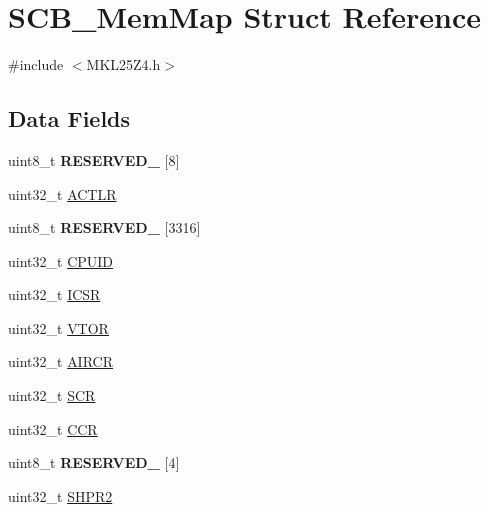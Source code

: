 \hypertarget{struct_s_c_b___mem_map}{}\section{S\+C\+B\+\_\+\+Mem\+Map Struct Reference}
\label{struct_s_c_b___mem_map}


{\ttfamily \#include $<$M\+K\+L25\+Z4.\+h$>$}

\subsection*{Data Fields}
\begin{DoxyCompactItemize}
\item 
\mbox{\label{struct_s_c_b___mem_map_ad1b50f88903f5b63f2b92b7195511d00}} 
uint8\+\_\+t {\bfseries R\+E\+S\+E\+R\+V\+E\+D\+\_} \mbox{[}8\mbox{]}
\item 
uint32\+\_\+t \hyperlink{struct_s_c_b___mem_map_a474a33074611146734690e48ed41282e}{A\+C\+T\+LR}
\item 
\mbox{\label{struct_s_c_b___mem_map_ab112bcf2a89a8f23d7c0a9f7c2ba687b}} 
uint8\+\_\+t {\bfseries R\+E\+S\+E\+R\+V\+E\+D\+\_} \mbox{[}3316\mbox{]}
\item 
uint32\+\_\+t \hyperlink{struct_s_c_b___mem_map_ad020795dcc3605b4c828af83df8b8836}{C\+P\+U\+ID}
\item 
uint32\+\_\+t \hyperlink{struct_s_c_b___mem_map_aafbaa0d0a4b79969877c9b84be8aaf7a}{I\+C\+SR}
\item 
uint32\+\_\+t \hyperlink{struct_s_c_b___mem_map_aa327db1d9948595498fba43acc8d336b}{V\+T\+OR}
\item 
uint32\+\_\+t \hyperlink{struct_s_c_b___mem_map_a3f874ca1c6e17ae4beadac22e8ec17ec}{A\+I\+R\+CR}
\item 
uint32\+\_\+t \hyperlink{struct_s_c_b___mem_map_ac8d0a0d974bde944d42429065dd2f44a}{S\+CR}
\item 
uint32\+\_\+t \hyperlink{struct_s_c_b___mem_map_aa6e957027d8c505047cd58101bb784aa}{C\+CR}
\item 
\mbox{\label{struct_s_c_b___mem_map_a5aec30bee30f8ce5b1a151821cf79146}} 
uint8\+\_\+t {\bfseries R\+E\+S\+E\+R\+V\+E\+D\+\_} \mbox{[}4\mbox{]}
\item 
uint32\+\_\+t \hyperlink{struct_s_c_b___mem_map_a1636322022eb10e4acedf40018708b68}{S\+H\+P\+R2}

\end{DoxyCompactItemize}
